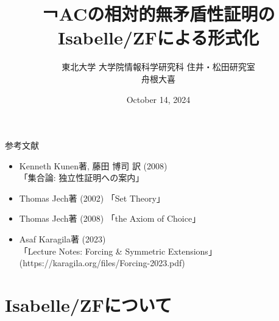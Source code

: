 \documentclass[17pt,aspectratio=169]{beamer}
\title{￢ACの相対的無矛盾性証明のIsabelle/ZFによる形式化}
\author{東北大学 大学院情報科学研究科 住井・松田研究室 \\ 舟根大喜}
\date{October 14, 2024}
\begin{document}
\maketitle

\begin{frame} {参考文献} 
      
    {\small
        \begin{itemize}[itemsep=5pt]
            \item Kenneth Kunen著, 藤田 博司 訳 (2008) \\「集合論: 独立性証明への案内」
            \item Thomas Jech著 (2002) 「Set Theory」
            \item Thomas Jech著 (2008) 「the Axiom of Choice」
            \item Asaf Karagila著 (2023) \\ 「Lecture Notes: Forcing \& Symmetric Extensions」 \\
                  {\small (https://karagila.org/files/Forcing-2023.pdf) }
        \end{itemize}}
\end{frame}

\section{Isabelle/ZFについて}
\end{document}
